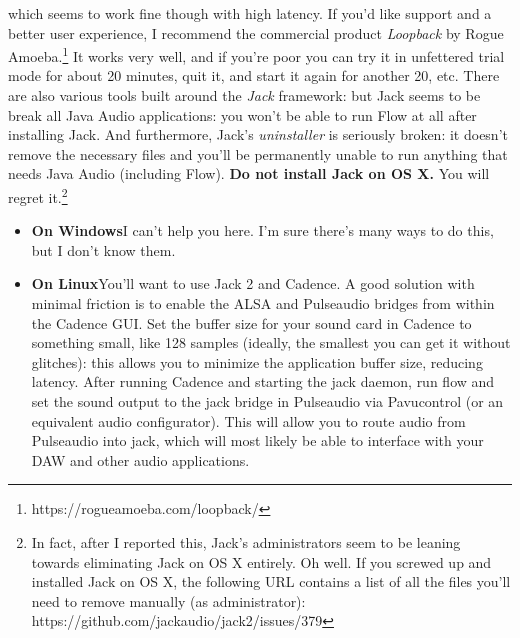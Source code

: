 \documentclass{article}
\newcommand\name{Flow}
\begin{document}
\begin{itemize}
which seems to work fine though with high latency.  If you'd like support and a better user experience, I recommend the commercial product {\it Loopback} by Rogue Amoeba.\footnote{https:/\!/rogueamoeba.com/loopback/}  It works very well, and if you're poor you can try it in unfettered trial mode for about 20 minutes, quit it, and start it again for another 20, etc.   There are also various tools built around the {\it Jack} framework: but Jack seems to be break all Java Audio applications: you won't be able to run {\name} at all after installing Jack.  And furthermore, Jack's {\it uninstaller} is seriously broken: it doesn't remove the necessary files and you'll be permanently unable to run anything that needs Java Audio (including {\name}).  {\color{red}\bf Do not install Jack on OS X.}  You will regret it.\footnote{In fact, after I reported this, Jack's administrators seem to be leaning towards eliminating Jack on OS X entirely.  Oh well.  If you screwed up and installed Jack on OS X, the following URL contains a list of all the files you'll need to remove manually (as administrator): https:/\!/github.com/jackaudio/jack2/issues/379}

\end{itemize}

\begin{itemize}
\item {\bf On Windows}\quad I can't help you here.  I'm sure there's many ways to do this, but I don't know them.

\item {\bf On Linux}\quad You'll want to use Jack 2 and Cadence. A good solution with minimal friction is to enable the ALSA and Pulseaudio bridges from within the Cadence GUI. Set the buffer size for your sound card in Cadence to something small, like 128 samples (ideally, the smallest you can get it without glitches): this allows you to minimize the application buffer size, reducing latency. After running Cadence and starting the jack daemon, run flow and set the sound output to the jack bridge in Pulseaudio via Pavucontrol (or an equivalent audio configurator). This will allow you to route audio from Pulseaudio into jack, which will most likely be able to interface with your DAW and other audio applications.

\end{itemize}
\end{document}
